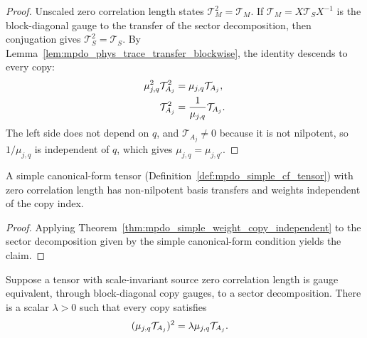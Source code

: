 \begin{proof}\leanok
    Unscaled zero correlation length states
    $\mathcal T_M^{2}=\mathcal T_M$. If
    $\mathcal T_M=X\mathcal T_SX^{-1}$ is the block-diagonal gauge to the
    transfer of the sector decomposition, then conjugation gives
    $\mathcal T_S^{2}=\mathcal T_S$.
    By
    Lemma~\ref{lem:mpdo_phys_trace_transfer_blockwise}, the identity
    descends to every copy:
    \begin{align}
        \mu_{j,q}^{2}\mathcal T_{A_j}^{2}
         & =\mu_{j,q}\mathcal T_{A_j},
        \notag                                   \\
        \mathcal T_{A_j}^{2}
         & =\frac{1}{\mu_{j,q}}\mathcal T_{A_j}.
        \notag
    \end{align}
    The left side does not depend on $q$, and
    $\mathcal T_{A_j}\ne0$ because it is not nilpotent, so
    $1/\mu_{j,q}$ is independent of $q$, which gives
    $\mu_{j,q}=\mu_{j,q'}$.
\end{proof}

\begin{corollary}
    \label{cor:mpdo_simple_zcl_weight_copy_independent}
    \leanok
    A simple canonical-form tensor
    (Definition~\ref{def:mpdo_simple_cf_tensor}) with zero correlation length
    has non-nilpotent basis transfers and weights independent of the copy
    index.
\end{corollary}

\begin{proof}\leanok
    Applying Theorem~\ref{thm:mpdo_simple_weight_copy_independent} to the
    sector decomposition given by the simple canonical-form condition yields
    the claim.
\end{proof}

\begin{lemma}
    \label{lem:mpdo_scale_invariant_blockwise_zcl_equation}
    \leanok
    Suppose a tensor with scale-invariant source zero correlation length is
    gauge equivalent, through block-diagonal copy gauges, to a sector
    decomposition. There is a scalar $\lambda>0$ such that every copy
    satisfies
    \begin{align}
        (\mu_{j,q}\mathcal T_{A_j})^2
         & =\lambda\mu_{j,q}\mathcal T_{A_j}.
        \notag
    \end{align}
\end{lemma}

